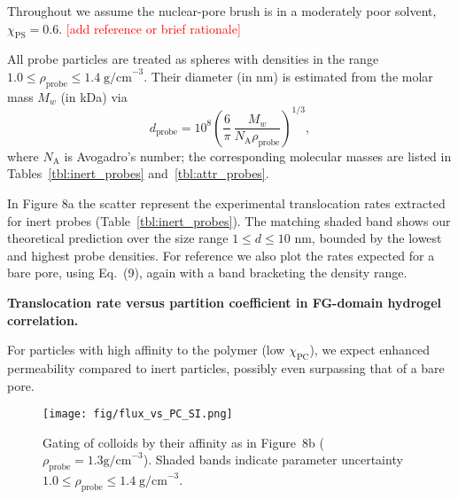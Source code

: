 \documentclass[10pt, a4paper, twocolumn]{article}
\newcommand\todo[1]{\textcolor{red}{#1}}
\begin{document}
Throughout we assume the nuclear-pore brush is in a moderately poor solvent, $\chi_{\text{PS}} = 0.6$. \todo{[add reference or brief rationale]}

All probe particles are treated as spheres with densities in the range $1.0 \le \rho_{\text{probe}} \le 1.4\;\text{g/cm}^{-3}$.  Their
diameter (in nm) is estimated from the molar mass $M_{w}$ (in kDa) via
\begin{equation}
  d_{\text{probe}}
  = 10^{8}
    \left(
      \frac{6}{\pi}\,
      \frac{M_{w}}{N_{\text{A}}\rho_{\text{probe}}}
    \right)^{\!1/3},
  \label{eq:d_probe}
\end{equation}
where $N_{\text{A}}$ is Avogadro's number; the corresponding molecular masses are listed in Tables~\ref{tbl:inert_probes} and~\ref{tbl:attr_probes}.

In Figure 8a the scatter represent the experimental translocation rates extracted for inert probes (Table~\ref{tbl:inert_probes}).
The matching shaded band shows our theoretical prediction over the size range $1 \le d \le 10$ nm, bounded by the lowest and highest probe densities.
For reference we also plot the rates expected for a bare pore, using Eq.~(9), again with a band bracketing the density range.




\textbf{Translocation rate versus partition coefficient in FG-domain hydrogel correlation.}

For particles with high affinity to the polymer (low $\chi_{\text{PC}}$), we expect enhanced permeability compared to inert particles, possibly even surpassing that of a bare pore.

\begin{figure}[]
    \centering
    \texttt{[image: fig/flux\_vs\_PC\_SI.png]}
    \caption{%
    Gating of colloids by their affinity as in Figure~8b ($\rho_{\text{probe}} =1.3 \text{g/cm}^{-3}$).
    Shaded bands indicate parameter uncertainty $1.0 \le \rho_{\text{probe}} \le 1.4\;\text{g/cm}^{-3}$.
    }
    \label{fig:flux_vs_PC}
\end{figure}
\end{document}
